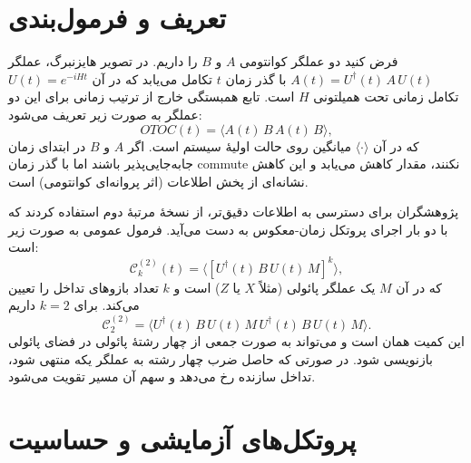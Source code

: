 \section{تعریف و فرمول‌بندی }

فرض کنید دو عملگر کوانتومی \(A\) و \(B\) را داریم. در تصویر هایزنبرگ، عملگر \(A(t)=U^{\dagger}(t)\,A\,U(t)\) با گذر زمان \(t\) تکامل می‌یابد که در آن \(U(t)=e^{-iHt}\) تکامل زمانی تحت همیلتونی \(H\) است. تابع همبستگی خارج از ترتیب زمانی  برای این دو عملگر به صورت زیر تعریف می‌شود:
\begin{equation}
  OTOC(t)=\langle A(t)\,B\,A(t)\,B\rangle,
\end{equation}
که در آن \(\langle\cdot\rangle\) میانگین روی حالت اولیهٔ سیستم است. اگر \(A\) و \(B\) در ابتدای زمان جابه‌جایی‌پذیر باشند اما با گذر زمان commute نکنند، مقدار  کاهش می‌یابد و این کاهش نشانه‌ای از پخش اطلاعات (اثر پروانه‌ای کوانتومی) است.

پژوهشگران برای دسترسی به اطلاعات دقیق‌تر، از نسخهٔ مرتبهٔ دوم  استفاده کردند که با دو بار اجرای پروتکل زمان-معکوس به دست می‌آید. فرمول عمومی  به صورت زیر است:
\begin{equation}
  \mathcal{C}_k^{(2)}(t)=\bigl\langle \left[ U^{\dagger}(t)\,B\,U(t)\,M\right]^k \bigr\rangle,
\end{equation}
که در آن \(M\) یک عملگر پائولی (مثلاً \(X\) یا \(Z\)) است و \(k\) تعداد بازوهای تداخل را تعیین می‌کند. برای \(k=2\) داریم
\begin{equation}
  \mathcal{C}_2^{(2)}=\langle U^{\dagger}(t)\,B\,U(t)\,M\,U^{\dagger}(t)\,B\,U(t)\,M\rangle.
\end{equation}
این کمیت همان  است و می‌تواند به صورت جمعی از چهار رشتهٔ پائولی در فضای پائولی بازنویسی شود. در صورتی که حاصل ضرب چهار رشته به عملگر یکه منتهی شود، تداخل سازنده رخ می‌دهد و سهم آن مسیر تقویت می‌شود.

\section{پروتکل‌های آزمایشی و حساسیت }

